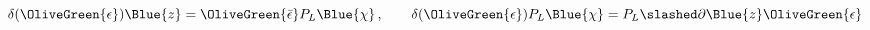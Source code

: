 \begin{equation}
  \delta(\OliveGreen{\epsilon }) \Blue{z}= \OliveGreen{\bar \epsilon}P_L
  \Blue{\chi}\,, \qquad
 \delta(\OliveGreen{\epsilon })P_L\Blue{\chi }  =  P_L\slashed \partial \Blue{z}\OliveGreen{\epsilon}
 \label{transfosChiralM}
\end{equation}

